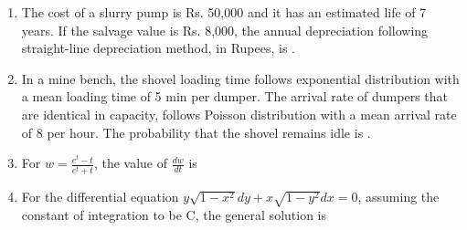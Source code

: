 \documentclass[journal,12pt,onecolumn]{IEEEtran}
\theoremstyle{remark}
\begin{document}
\begin{enumerate}
\hfill{}

\item The cost of a slurry pump is Rs. 50,000 and it has an estimated life of 7 years. If the salvage value is Rs. 8,000, the annual depreciation following straight-line depreciation method, in Rupees, is \underline{\hspace{2cm}} .

\hfill{}

\item In a mine bench, the shovel loading time follows exponential distribution with a mean loading time of 5 min per dumper. The arrival rate of dumpers that are identical in capacity, follows Poisson distribution with a mean arrival rate of 8 per hour. The probability that the shovel remains idle is \underline{\hspace{2cm}} .

\hfill{}

\item For $w=\frac{e^{t}-t}{e^{t}+t}$, the value of $\frac{dw}{dt}$ is

\hfill{}

\begin{enumerate}
\end{enumerate}

\item For the differential equation $y\sqrt{1-x^{2}}dy+x\sqrt{1-y^{2}}dx=0$, assuming the constant of integration to be C, the general solution is

\hfill{}

\begin{enumerate}
\end{enumerate}


\end{enumerate}
\end{document}
